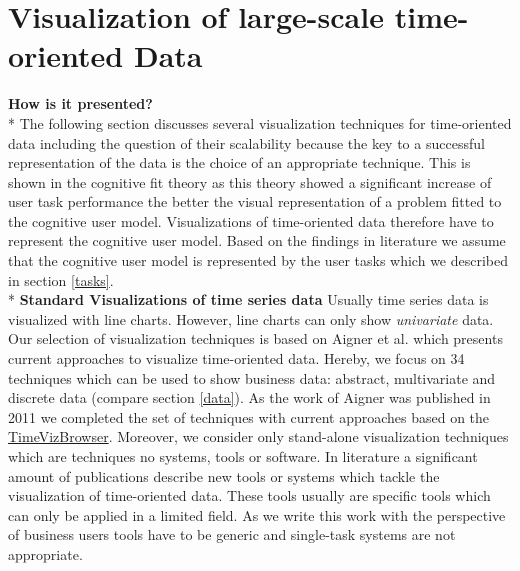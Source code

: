 \section{Visualization of large-scale time-oriented Data} \label{vis}
\textbf{How is it presented?}\\*
The following section discusses several visualization techniques for time-oriented data including the question of their scalability because the key to a successful representation of the data is the choice of an appropriate technique. This is shown in the cognitive fit theory\cite{Vessey1991} as this theory showed a significant increase of user task performance the better the visual representation of a problem fitted to the cognitive user model. Visualizations of time-oriented data therefore have to represent the cognitive user model. Based on the findings in literature we assume that the cognitive user model is represented by the user tasks which we described in section \ref{tasks}.\\* 
\textbf{Standard Visualizations of time series data}
Usually time series data is visualized with line charts. However, line charts can only show \textit{univariate} data. Our selection of visualization techniques is based on Aigner et al.\cite{Aigner2011} which presents current approaches to visualize time-oriented data. Hereby, we focus on 34 techniques which can be used to show business data: abstract, multivariate and discrete data (compare section \ref{data}). 
As the work of Aigner was published in 2011 we completed the set of techniques with current approaches based on the \href{http://survey.timeviz.net/}{TimeVizBrowser}. Moreover, we consider only stand-alone visualization techniques which are techniques no systems, tools or software. In literature a significant amount of publications describe new tools or systems which tackle the visualization of time-oriented data. These tools usually are specific tools which can only be applied in a limited field. As we write this work with the perspective of business users tools have to be generic and single-task systems are not appropriate.

